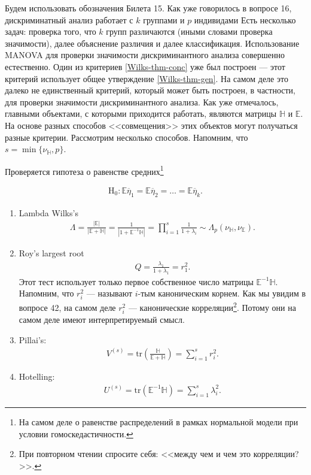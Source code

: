 Будем использовать обозначения Билета 15.
Как уже говорилось в вопросе 16, дискриминатный анализ работает с $k$ группами и $p$ индивидами
Есть несколько задач: проверка того, что $k$ групп различаются (иными словами
проверка значимости), далее объяснение различия и далее классификация.
Использование MANOVA для проверки значимости дискриминантного анализа совершенно естественно.
Один из критериев \ref{Wilks-thm-conc} уже был построен --- этот критерий использует
общее утверждение \ref{Wilks-thm-gen}.
На самом деле это далеко не единственный критерий, который может быть построен, в частности, для проверки значимости дискриминантного анализа.
Как уже отмечалось, главными объектами, с которыми приходится работать, являются матрицы $\mathbb H$ и $\mathbb E$.
На основе разных способов <<совмещения>> этих объектов могут получаться разные критерии.
Рассмотрим несколько способов. Напомним, что $s = \min\{\nu_\mathbb H, p\}$.

Проверяется гипотеза о равенстве средних\footnote{На самом деле о равенстве распределений в рамках нормальной модели при условии гомоскедастичности.}

\begin{gather*}
    \mathrm H_0: \mathbb E \overline \eta_1 = \mathbb E \overline \eta_2 = \ldots = \mathbb E \overline \eta_k.
\end{gather*}
\begin{enumerate}
    \item Lambda Wilks's
        \begin{gather*}
            \Lambda = \frac{|\mathbb{E}|}{|\mathbb E + \mathbb H|} = \frac{1}{|1 + \mathbb E^{-1} \mathbb H|} = \prod_{i=1}^s \frac{1}{1 + \lambda_i}
            \sim \Lambda_p(\nu_\mathbb H, \nu_\mathbb E).
        \end{gather*}
    \item Roy's largest root
        \begin{gather*}
            Q = \frac{\lambda_1}{1 + \lambda_1} = r_1^2.
        \end{gather*}
        Этот тест использует только первое собственное число матрицы $\mathbb E^{-1} \mathbb H$.
        Напомним, что $r_i^2$ --- называют $i$-тым каноническим корнем. Как мы увидим в вопросе 42, на самом деле $r_i^2$ --- канонические корреляции\footnote{
        При повторном чтении спросите себя: <<между чем и чем это корреляции?>>.}.
        Потому они на самом деле имеют интерпретируемый смысл.
    \item Pillai's:
        \begin{gather*}
            V^{(s)} = \mathrm {tr} \left(\frac{\mathbb H}{\mathbb E + \mathbb H}\right) = \sum_{i=1}^s r_i^2.
        \end{gather*}
    \item Hotelling:
        \begin{gather*}
            U^{(s)} = \mathrm {tr} \left(\mathbb E^{-1} \mathbb H \right) = \sum_{i=1}^s \lambda_i^2.
        \end{gather*}
\end{enumerate}

